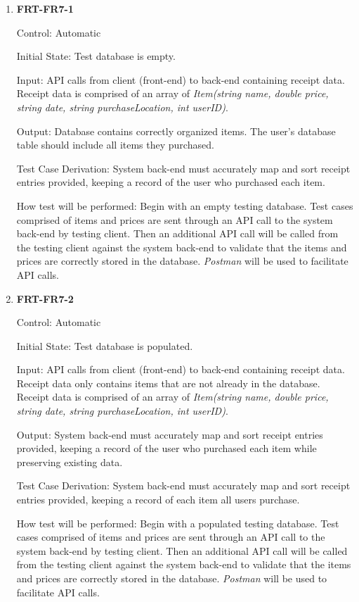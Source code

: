 \documentclass[12pt, titlepage]{article}
\begin{document}
\begin{enumerate}

\item{\textbf{FRT-FR7-1}}

Control: Automatic
          
Initial State: Test database is empty.

Input: API calls from client (front-end) to back-end containing receipt data. Receipt data is comprised of an array of \textit{Item(string name, double price, string date, string purchaseLocation, int userID)}.
          
Output: Database contains correctly organized items. The user's database table should include all items they purchased.

Test Case Derivation: System back-end must accurately map and sort receipt entries provided, keeping a record of the user who purchased each item.
          
How test will be performed: Begin with an empty testing database. Test cases comprised of items and prices are sent through an API call to the system back-end by testing client. Then an additional API call will be called from the testing client against the system back-end to validate that the items and prices are correctly stored in the database. \textit{Postman} will be used to facilitate API calls. 

\item{\textbf{FRT-FR7-2}}

Control: Automatic
          
Initial State: Test database is populated.

Input: API calls from client (front-end) to back-end containing receipt data. Receipt data only contains items that are not already in the database. Receipt data is comprised of an array of \textit{Item(string name, double price, string date, string purchaseLocation, int userID)}.
          
Output: System back-end must accurately map and sort receipt entries provided, keeping a record of the user who purchased each item while preserving existing data.

Test Case Derivation: System back-end must accurately map and sort receipt entries provided, keeping a record of each item all users purchase.
          
How test will be performed: Begin with a populated testing database. Test cases comprised of items and prices are sent through an API call to the system back-end by testing client. Then an additional API call will be called from the testing client against the system back-end to validate that the items and prices are correctly stored in the database. \textit{Postman} will be used to facilitate API calls. 


\end{enumerate}
\end{document}
